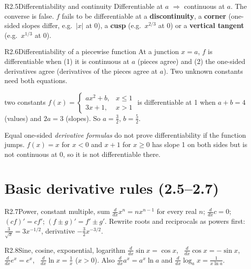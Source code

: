 \documentclass{apcalc}
\begin{document}
\begin{rulebox}{R2.5}{Differentiability and continuity}
Differentiable at $a$ $\Rightarrow$ continuous at $a$. The converse is false. $f$ fails to be differentiable at a \textbf{discontinuity}, a \textbf{corner} (one-sided slopes differ, e.g.\ $|x|$ at 0), a \textbf{cusp} (e.g.\ $x^{2/3}$ at 0) or a \textbf{vertical tangent} (e.g.\ $x^{1/3}$ at 0).
\end{rulebox}

\begin{rulebox}{R2.6}{Differentiability of a piecewise function}
At a junction $x=a$, $f$ is differentiable when (1) it is continuous at $a$ (pieces agree) and (2) the one-sided derivatives agree (derivatives of the pieces agree at $a$). Two unknown constants need both equations.
\end{rulebox}

\begin{example}{two constants}
$f(x)=\begin{cases}ax^2+b,&x\le1\\ 3x+1,&x>1\end{cases}$ is differentiable at 1 when $a+b=4$ (values) and $2a=3$ (slopes). So $a=\frac32$, $b=\frac52$. 
\end{example}

\begin{trap}
Equal one-sided \emph{derivative formulas} do not prove differentiability if the function jumps. $f(x)=x$ for $x<0$ and $x+1$ for $x\ge0$ has slope 1 on both sides but is not continuous at 0, so it is not differentiable there.
\end{trap}

\section{Basic derivative rules (2.5--2.7)}

\begin{rulebox}{R2.7}{Power, constant multiple, sum}
$\frac{d}{dx}x^n=nx^{n-1}$ for every real $n$; $\frac{d}{dx}c=0$; $(cf)'=cf'$; $(f\pm g)'=f'\pm g'$. Rewrite roots and reciprocals as powers first: $\frac{3}{\sqrt x}=3x^{-1/2}$, derivative $-\frac32x^{-3/2}$.
\end{rulebox}

\begin{rulebox}{R2.8}{Sine, cosine, exponential, logarithm}
$\frac{d}{dx}\sin x=\cos x$, \ $\frac{d}{dx}\cos x=-\sin x$, \ $\frac{d}{dx}e^x=e^x$, \ $\frac{d}{dx}\ln x=\frac1x$ ($x>0$). Also $\frac{d}{dx}a^x=a^x\ln a$ and $\frac{d}{dx}\log_a x=\frac{1}{x\ln a}$.
\end{rulebox}
\end{document}
